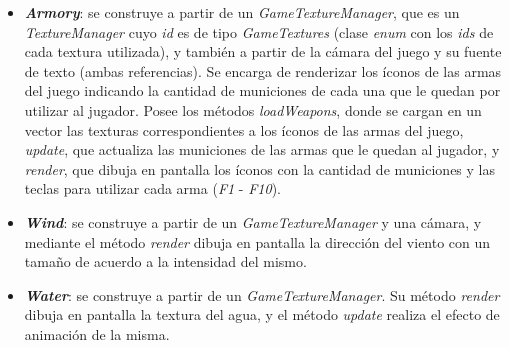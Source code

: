 \begin{itemize}
	\item \textbf{\textit{Armory}}: se construye a partir de un \textit{GameTextureManager}, que es un \textit{TextureManager} cuyo \textit{id} es de tipo \textit{GameTextures} (clase \textit{enum} con los \textit{ids} de cada textura utilizada), y también a partir de la cámara del juego y su fuente de texto (ambas referencias). Se encarga de renderizar los íconos de las armas del juego indicando la cantidad de municiones de cada una que le quedan por utilizar al jugador. Posee los métodos \textit{loadWeapons}, donde se cargan en un vector las texturas correspondientes a los íconos de las armas del juego, \textit{update}, que actualiza las municiones de las armas que le quedan al jugador, y \textit{render}, que dibuja en pantalla los íconos con la cantidad de municiones y las teclas para utilizar cada arma (\textit{F1} - \textit{F10}).
	
	\item \textbf{\textit{Wind}}: se construye a partir de un \textit{GameTextureManager} y una cámara, y mediante el método \textit{render} dibuja en pantalla la dirección del viento con un tamaño de acuerdo a la intensidad del mismo.
	
	\item \textbf{\textit{Water}}: se construye a partir de un \textit{GameTextureManager}. Su método \textit{render} dibuja en pantalla la textura del agua, y el método \textit{update} realiza el efecto de animación de la misma.
	
	
\end{itemize}


